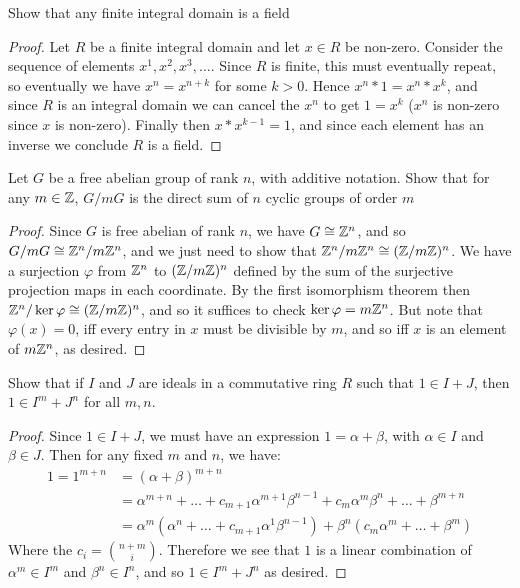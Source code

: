 \documentclass[11pt]{article}
\begin{document}
Show that any finite integral domain is a field

\begin{proof}
  Let $R$ be a finite integral domain and let $x \in R$ be non-zero.
  Consider the sequence of elements $x^1, x^2, x^3, \dots$.
  Since $R$ is finite, this must eventually repeat, so eventually we have $x^n = x^{n + k}$ for some $k > 0$.
  Hence $x^n * 1 = x^n * x^k$, and since $R$ is an integral domain we can cancel the $x^n$ to get $1 = x^k$ ($x^n$ is non-zero since $x$ is non-zero).
  Finally then $x * x^{k-1} = 1$, and since each element has an inverse we conclude $R$ is a field.
\end{proof}


Let $G$ be a free abelian group of rank $n$, with additive notation. Show that for any $m \in \mathbb{Z}$, $G/mG$ is the direct sum of $n$ cyclic groups of order $m$

\begin{proof}
  Since $G$ is free abelian of rank $n$, we have $G \cong \mathbb{Z}^n$, and so $G/mG \cong \mathbb{Z}^n / m \mathbb{Z}^n$, and we just need to show that $\mathbb{Z}^n / m \mathbb{Z}^n \cong (\mathbb{Z}/m\mathbb{Z})^n$.
  We have a surjection $\varphi$ from $\mathbb{Z}^n$ to $(\mathbb{Z}/m\mathbb{Z})^n$ defined by the sum of the surjective projection maps in each coordinate.
  By the first isomorphism theorem then $\mathbb{Z}^n / \ker \varphi \cong (\mathbb{Z}/m\mathbb{Z})^n$, and so it suffices to check $\ker \varphi = m \mathbb{Z}^n$.
  But note that $\varphi(x) = 0$, iff every entry in $x$ must be divisible by $m$, and so iff $x$ is an element of $m\mathbb{Z}^n$, as desired.
\end{proof}


Show that if $I$ and $J$ are ideals in a commutative ring $R$ such that $1 \in I + J$, then $1 \in I^m + J^n$ for all $m,n$.

\begin{proof}
  Since $1 \in I + J$, we must have an expression $1 = \alpha + \beta$, with $\alpha \in I$ and $\beta \in J$.
  Then for any fixed $m$ and $n$, we have:
  \begin{align*}
    1 = 1^{m + n}
    &= (\alpha + \beta)^{m + n} \\
    &= \alpha^{m+n} + \dots + c_{m+1}\alpha^{m+1}\beta^{n-1} +  c_{m}\alpha^m\beta^n + \dots + \beta^{m+n} \\
    &= \alpha^m (\alpha^n + \dots + c_{m+1}\alpha^{1}\beta^{n-1}) + \beta^n (c_{m}\alpha^m + \dots + \beta^{m})    
  \end{align*}
  Where the $c_i = \binom{n+m}{i}$. 
  Therefore we see that $1$ is a linear combination of $\alpha^m \in I^m$ and $\beta^n \in I^n$, and so $1 \in I^m + J^n$ as desired.
\end{proof}
\end{document}
